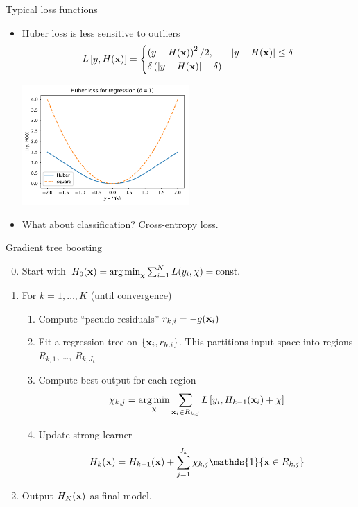 \documentclass[handout]{beamer}
\renewcommand{\indFun}{\ensuremath{\mathds{1}}}
\begin{document}
\begin{frame}{Typical loss functions}
\begin{itemize}[<+->]
	\item Huber loss is less sensitive to outliers
	\begin{gather*}
		L\left[ y, H(\mathrm{\mathbf{x}}) \right] = \begin{cases}
			\left( y - H(\mathrm{\mathbf{x}}) \right)^2/2, 
				& |y-H(\mathrm{\mathbf{x}})|\le \delta \\
			\delta\left( |y-H(\mathrm{\mathbf{x}})| - \delta \right)
		\end{cases}
	\end{gather*}
	\begin{center}
		\includegraphics[width=0.5\textwidth]{figs/Huber_loss}
	\end{center}
	
	\item What about classification? Cross-entropy loss.
\end{itemize}
\end{frame}

\begin{frame}{Gradient tree boosting}
\begin{enumerate}
	\setcounter{enumi}{-1}
	\item<+> Start with $ H_0(\mathrm{\mathbf{x}}) = \operatorname*{arg\,min}_{\chi} \sum_{i=1}^{N} L(y_i, \chi) = \text{const.} $
	\item<+-6> For $ k = 1, \ldots, K $ (until convergence)
	\begin{enumerate}[<+, 7->][a)]
		\item Compute ``pseudo-residuals'' $ r_{k, i} = - g(\mathrm{\mathbf{x}}_i) $
		\item Fit a regression tree on $ \{ \mathrm{\mathbf{x}}_i, r_{k, i} \} $. This partitions input space into regions $ R_{k, 1} $, \ldots, $ R_{k, J_k} $
		\item Compute best output for each region
		\begin{gather*}
			\chi_{k, j} = \operatorname*{arg\,min}_{\chi} \sum_{\mathrm{\mathbf{x}}_i\in R_{k, j}}
				L\left[ y_i, H_{k-1}(\mathrm{\mathbf{x}}_i) + \chi \right]
		\end{gather*}
		\item Update strong learner
		\begin{gather*}
			H_k(\mv x) = H_{k-1}(\mv x) 
			+ \sum_{j=1}^{J_k} \chi_{k, j} 
				\indFun\{ \mv x\in R_{k, j} \}
		\end{gather*}
	\end{enumerate}
	\item<+> Output $ H_K(\mathrm{\mathbf{x}}) $ as final model.
\end{enumerate}
\end{frame}
\end{document}
